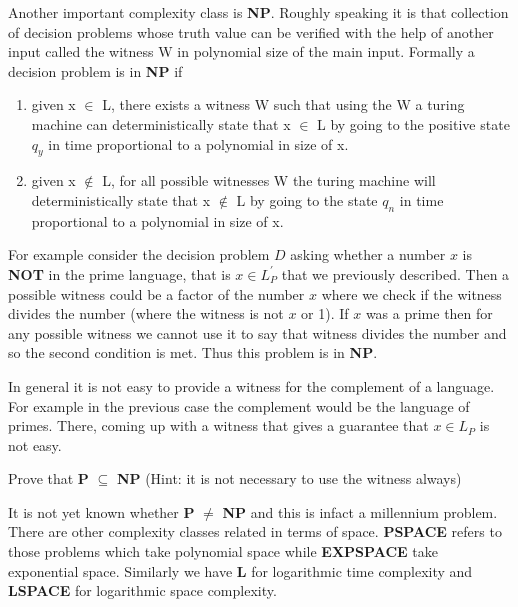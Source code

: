 Another important complexity class is \textbf{NP}. Roughly speaking it is that collection of decision problems whose truth value can be verified with the help of another input called the witness W in polynomial size of the main input.
Formally a decision problem is in \textbf{NP} if
\begin{enumerate}
    \item given x $\in $ L, there exists a witness W such that using the W a turing machine can deterministically state that x $\in$ L by going to the positive state $q_y$ in time proportional to a polynomial in size of x.
     \item given x $\not\in $ L, for all possible witnesses W the turing machine will deterministically state that x $\not\in$ L by going to the  state $q_n$ in time proportional to a polynomial in size of x.
\end{enumerate}

For example consider the decision problem $D$ asking whether a number $x$ is \textbf{NOT} in the prime language, that is $ x \in L_P^{'}$ that we previously described. Then a possible witness could be a factor of the number $x$ where we check if the witness divides the number (where the witness is not $x$ or 1). If $x$ was a prime then for any possible witness we cannot use it to say that witness divides the number  and so the second condition is met. Thus this problem is in \textbf{NP}.

In general it is not easy to provide a witness for the complement of a language. For example in the previous case the complement would be the language of primes. There, coming up with a witness that gives a guarantee that $x \in L_P$ is not easy.

\begin{exercise}
Prove that \textbf{P} $\subseteq$ \textbf{NP}
(Hint: it is not necessary to use the witness always)
\end{exercise}
It is not yet known whether  \textbf{P} $\neq$ \textbf{NP} and this is infact a millennium problem. 
There are other complexity classes related in terms of space. \textbf{PSPACE} refers to those problems which take polynomial space while \textbf{EXPSPACE} take exponential space. Similarly we have \textbf{L} for logarithmic time complexity and \textbf{LSPACE} for logarithmic space complexity.

